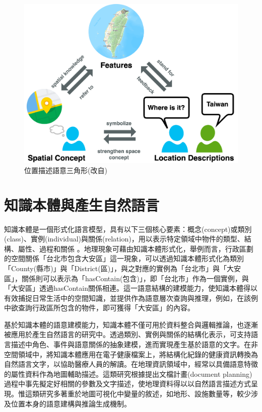 \begin{figure}[!htbp]
\includegraphics[width = \textwidth]{figures/congition.png}
\centering
\caption{位置描述語意三角形(改自\citet{RN128})}
\label{fig:congition}
\end{figure}

\section{知識本體與產生自然語言}

知識本體是一個形式化語言模型，具有以下三個核心要素：概念(concept)或類別(class)、實例(individual)與關係(relation)，用以表示特定領域中物件的類型、結構、屬性、過程和關係\citep{RN24} 。地理現象可藉由知識本體形式化，舉例而言，行政區劃的空間關係「台北市包含大安區」這一現象，可以透過知識本體形式化為類別「County(縣市)」與「District(區)」，與之對應的實例為「台北市」與「大安區」，關係則可以表示為「hasContain(包含)」，即「台北市」作為一個實例，與「大安區」透過hasContain關係相連。這一語意結構的建模能力，使知識本體得以有效捕捉日常生活中的空間知識，並提供作為語意層次查詢與推理，例如，在該例中欲查詢行政區所包含的物件，即可獲得「大安區」的內容。

基於知識本體的語意建模能力，知識本體不僅可用於資料整合與邏輯推論，也逐漸被應用於產生自然語言的研究中。透過類別、實例與關係的結構化表示，可支持語言描述中角色、事件與語意關係的抽象建模，進而實現產生基於語意的文字。在非空間領域中，\citet{RN163}將知識本體應用在電子健康檔案上，將結構化紀錄的健康資訊轉換為自然語言文字，以協助醫療人員的解讀。在地理資訊領域中，經常以具備語意特徵的屬性資料作為地圖輔助描述\citep{RN165, RN166}。這類研究根據提出文檔計畫(document planning)過程中事先擬定好相關的參數及文字描述，使地理資料得以以自然語言描述方式呈現。惟這類研究多著重於地圖可視化中變量的敘述，如地形、設施數量等，較少涉及位置本身的語意建構與推論生成機制。

